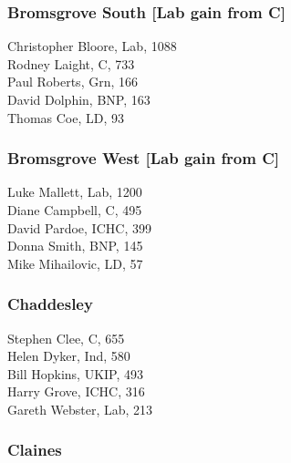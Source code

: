 \documentclass[a4paper,openany,10pt]{book}
\begin{document}
\subsubsection*{Bromsgrove South \hspace*{\fill}\nolinebreak[1]%
\enspace\hspace*{\fill}
[Lab gain from C]}



Christopher Bloore, Lab, 1088\\
Rodney Laight, C, 733\\
Paul Roberts, Grn, 166\\
David Dolphin, BNP, 163\\
Thomas Coe, LD, 93\\


\subsubsection*{Bromsgrove West \hspace*{\fill}\nolinebreak[1]%
\enspace\hspace*{\fill}
[Lab gain from C]}



Luke Mallett, Lab, 1200\\
Diane Campbell, C, 495\\
David Pardoe, ICHC, 399\\
Donna Smith, BNP, 145\\
Mike Mihailovic, LD, 57\\


\subsubsection*{Chaddesley}



Stephen Clee, C, 655\\
Helen Dyker, Ind, 580\\
Bill Hopkins, UKIP, 493\\
Harry Grove, ICHC, 316\\
Gareth Webster, Lab, 213\\


\subsubsection*{Claines}
\end{document}
